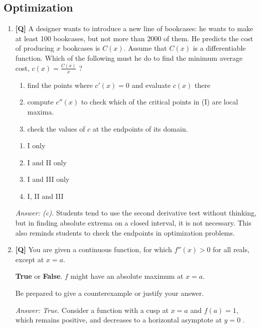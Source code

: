 \documentclass[12pt]{article}
\begin{document}
\subsection{Optimization}

\begin{enumerate}

\item {\bf [Q]} A designer wants to introduce a new line of bookcases: 
he wants to make at least 100 bookcases, but not more than $2000$ of them. He predicts
the cost of producing $x$ bookcases is $C(x)$. Assume that $C(x)$ is a differentiable function.
Which of the following must he do to find the minimum average cost, $c(x)=\frac{C(x)}{x}$ ?

\renewcommand{\theenumii}{\Roman{enumii}}
\begin{enumerate}
\item find the points where $c'(x)=0$ and evaluate $c(x)$ there
\item compute $c''(x)$ to check which of the critical points in (I)
 are local maxima.
\item check the values of $c$ at the endpoints of its domain.
\end{enumerate}
\renewcommand{\theenumii}{\alph{enumii}}
\begin{enumerate}
\item I only
\item I and II only
\item I and III only
\item I, II and III
\end{enumerate}

{\it Answer: (c).} Students tend to use the second derivative test without thinking, but in finding absolute extrema on a closed interval, it is not necessary. This also reminds students to check the endpoints in optimization problems.

\bigskip

\item {\bf [Q]} You are given a continuous function, for which $f''(x)>0$
for all reals, except at $x=a$.

\textbf{True} or \textbf{False}. $f$ might have an absolute
maximum at $x=a$.

Be prepared to give a counterexample or justify your answer.

{\it Answer: True.} Consider a function with a cusp at $x=a$ and
$f(a)=1$, which remains positive, and decreases to a horizontal
asymptote at $y=0$ . 


\end{enumerate}
\end{document}
